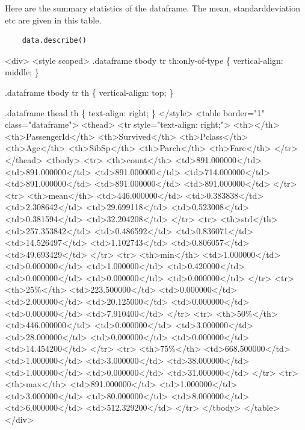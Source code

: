 \documentclass[11pt]{article}
\begin{document}
Here are the summary statistics of the dataframe. The mean,
standarddeviation etc are given in this table.

\begin{verbatim}
    data.describe()
\end{verbatim}

\begin{HTML}
<div>
<style scoped>
    .dataframe tbody tr th:only-of-type \{
	vertical-align: middle;
    \}

.dataframe tbody tr th \{
    vertical-align: top;
\}

    .dataframe thead th \{
	text-align: right;
    \}
</style>
<table border="1" class="dataframe">
  <thead>
    <tr style="text-align: right;">
      <th></th>
      <th>PassengerId</th>
      <th>Survived</th>
      <th>Pclass</th>
      <th>Age</th>
      <th>SibSp</th>
      <th>Parch</th>
      <th>Fare</th>
    </tr>
  </thead>
  <tbody>
    <tr>
      <th>count</th>
      <td>891.000000</td>
      <td>891.000000</td>
      <td>891.000000</td>
      <td>714.000000</td>
      <td>891.000000</td>
      <td>891.000000</td>
      <td>891.000000</td>
    </tr>
    <tr>
      <th>mean</th>
      <td>446.000000</td>
      <td>0.383838</td>
      <td>2.308642</td>
      <td>29.699118</td>
      <td>0.523008</td>
      <td>0.381594</td>
      <td>32.204208</td>
    </tr>
    <tr>
      <th>std</th>
      <td>257.353842</td>
      <td>0.486592</td>
      <td>0.836071</td>
      <td>14.526497</td>
      <td>1.102743</td>
      <td>0.806057</td>
      <td>49.693429</td>
    </tr>
    <tr>
      <th>min</th>
      <td>1.000000</td>
      <td>0.000000</td>
      <td>1.000000</td>
      <td>0.420000</td>
      <td>0.000000</td>
      <td>0.000000</td>
      <td>0.000000</td>
    </tr>
    <tr>
      <th>25\%</th>
      <td>223.500000</td>
      <td>0.000000</td>
      <td>2.000000</td>
      <td>20.125000</td>
      <td>0.000000</td>
      <td>0.000000</td>
      <td>7.910400</td>
    </tr>
    <tr>
      <th>50\%</th>
      <td>446.000000</td>
      <td>0.000000</td>
      <td>3.000000</td>
      <td>28.000000</td>
      <td>0.000000</td>
      <td>0.000000</td>
      <td>14.454200</td>
    </tr>
    <tr>
      <th>75\%</th>
      <td>668.500000</td>
      <td>1.000000</td>
      <td>3.000000</td>
      <td>38.000000</td>
      <td>1.000000</td>
      <td>0.000000</td>
      <td>31.000000</td>
    </tr>
    <tr>
      <th>max</th>
      <td>891.000000</td>
      <td>1.000000</td>
      <td>3.000000</td>
      <td>80.000000</td>
      <td>8.000000</td>
      <td>6.000000</td>
      <td>512.329200</td>
    </tr>
  </tbody>
</table>
</div>
\end{HTML}
\end{document}
